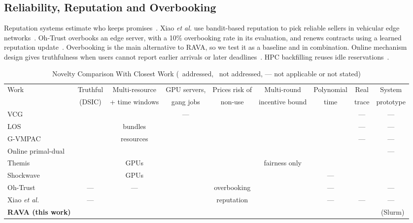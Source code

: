 \documentclass[journal]{IEEEtran}
\newcommand{\cmark}{\ding{51}}
\newcommand{\xmark}{\ding{55}}
\theoremstyle{remark}
\begin{document}
\subsection{Reliability, Reputation and Overbooking}
Reputation systems estimate who keeps promises~\cite{resnick2000,josang2002}. Xiao \emph{et al.} use bandit-based reputation to pick reliable sellers in vehicular edge networks~\cite{xiao2023mab}. Oh-Trust overbooks an edge server, with a 10\% overbooking rate in its evaluation, and renews contracts using a learned reputation update~\cite{qi2025ohtrust}. Overbooking is the main alternative to RAVA, so we test it as a baseline and in combination. Online mechanism design gives truthfulness when users cannot report earlier arrivals or later deadlines~\cite{hajiaghayi2004,porter2004}. HPC backfilling reuses idle reservations~\cite{lifka1995,mualem2001}.

\begin{table}[!t]
\caption{Novelty Comparison With Closest Work (\cmark\ addressed, \xmark\ not addressed, --- not applicable or not stated)}\label{tab:novel}
\centering\footnotesize\setlength{\tabcolsep}{3.2pt}
\begin{tabular}{@{}lcccccccc@{}}
\toprule
Work & Truthful & Multi-resource & GPU servers, & Prices risk of & Multi-round & Polynomial & Real & System\\
 & (DSIC) & + time windows & gang jobs & non-use & incentive bound & time & trace & prototype\\
\midrule
VCG~\cite{clarke1971,groves1973} & \cmark & \cmark & --- & \xmark & \xmark & \xmark & --- & ---\\
LOS~\cite{lehmann2002} & \cmark & bundles & \xmark & \xmark & \xmark & \cmark & --- & ---\\
G-VMPAC~\cite{nejad2015} & \cmark & resources & \xmark & \xmark & \xmark & \cmark & --- & ---\\
Online primal-dual~\cite{zhang2017ton} & \cmark & \cmark & \xmark & \xmark & \xmark & \cmark & \cmark & ---\\
Themis~\cite{mahajan2020themis} & \cmark & GPUs & \cmark & \xmark & fairness only & \cmark & \cmark & \cmark\\
Shockwave~\cite{zheng2023shockwave} & \xmark & GPUs & \cmark & \xmark & \xmark & --- & \cmark & \cmark\\
Oh-Trust~\cite{qi2025ohtrust} & --- & --- & \xmark & overbooking & \xmark & --- & \cmark & ---\\
Xiao \emph{et al.}~\cite{xiao2023mab} & --- & \xmark & \xmark & reputation & \xmark & --- & --- & ---\\
\textbf{RAVA (this work)} & \cmark & \cmark & \cmark & \cmark & \cmark & \cmark & \cmark & \cmark\ (Slurm)\\
\bottomrule
\end{tabular}
\end{table}
\end{document}
